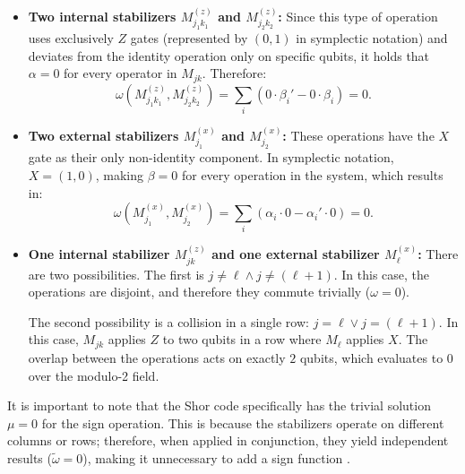 \begin{itemize}
  \item \textbf{Two internal stabilizers $M_{j_1 k_1}^{(z)}$ and $M_{j_2 k_2}^{(z)}$:}
    Since this type of operation uses exclusively $Z$ gates (represented by $(0, 1)$ in symplectic notation) and deviates from the identity operation only on specific qubits, it holds that $\alpha = 0$ for every operator in $M_{j k}$. Therefore:
    \begin{equation}
      \omega(M_{j_1 k_1}^{(z)}, M_{j_2 k_2}^{(z)}) = \sum_{i} (0 \cdot \beta_i' - 0 \cdot \beta_i) = 0
      \label{eq:deviation_internal_conmutation}
    .\end{equation}

  \item \textbf{Two external stabilizers $M_{j_1}^{(x)}$ and $M_{j_2}^{(x)}$:}
    These operations have the $X$ gate as their only non-identity component. In symplectic notation, $X = (1, 0)$, making $\beta = 0$ for every operation in the system, which results in:
    \begin{equation}
      \omega(M_{j_1}^{(x)}, M_{j_2}^{(x)}) = \sum_{i} (\alpha_i \cdot 0 - \alpha_i' \cdot 0) = 0
      \label{eq:deviation_external_conmutation}
    .\end{equation}

  \item \textbf{One internal stabilizer $M_{j k}^{(z)}$ and one external stabilizer $M_{\ell}^{(x)}$:}
    There are two possibilities. The first is $j \neq \ell \land j \neq (\ell + 1)$. In this case, the operations are disjoint, and therefore they commute trivially ($\omega = 0$).
    
    The second possibility is a collision in a single row: $j = \ell \lor j = (\ell + 1)$. In this case, $M_{j k}$ applies $Z$ to two qubits in a row where $M_\ell$ applies $X$. The overlap between the operations acts on exactly $2$ qubits, which evaluates to $0$ over the modulo-2 field.
\end{itemize}

It is important to note that the Shor code specifically has the trivial solution $\mu = 0$ for the sign operation. This is because the stabilizers operate on different columns or rows; therefore, when applied in conjunction, they yield independent results ($\tilde{\omega} = 0$), making it unnecessary to add a sign function \citep{Cesar2024}.
